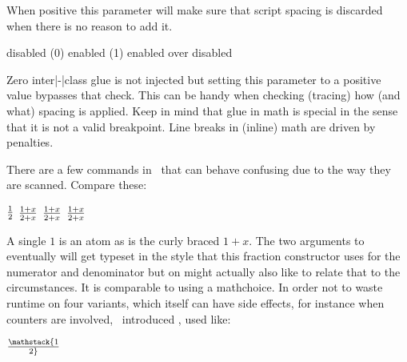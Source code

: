 \stopnewprimitive

\startnewprimitive[title={\prm {mathslackmode}}]

When positive this parameter will make sure that script spacing is discarded when
there is no reason to add it.

\startlinecorrection
{}
    {disabled (0)}
    {
     \space
     }
    {enabled (1)}
    {\startoverlay
       {     }
       { \red{}}
     \stopoverlay
     \space
     \startoverlay
       {     }
       { \red{}}
     \stopoverlay}
   {{\red enabled} over disabled}
\stopcombination
\stoplinecorrection

\stopnewprimitive

\startnewprimitive[title={\prm {mathspacingmode}}]

Zero inter|-|class glue is not injected but setting this parameter to a positive
value bypasses that check. This can be handy when checking (tracing) how (and
what) spacing is applied. Keep in mind that glue in math is special in the sense
that it is not a valid breakpoint. Line breaks in (inline) math are driven by
penalties.

\stopnewprimitive

\startnewprimitive[title={\prm {mathstack}}]

There are a few commands in \TEX\ that can behave confusing due to the way they
are scanned. Compare these:

\starttyping
$ 1 \over 2 $
$ 1 + x \over 2 + x$
$ {1 + x} \over {2 + x}$
$ {{1 + x} \over {2 + x}}$
\stoptyping

A single $1$ is an atom as is the curly braced ${1 + x}$. The two arguments to
 eventually will get typeset in the style that this fraction
constructor uses for the numerator and denominator but on might actually also
like to relate that to the circumstances. It is comparable to using a \prm
{mathchoice}. In order not to waste runtime on four variants, which itself can have
side effects, for instance when counters are involved, \LUATEX\ introduced
, used like:

\starttyping
$\mathstack {1 \over 2}$
\stoptyping

